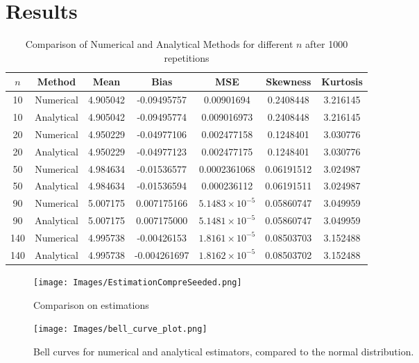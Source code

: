\documentclass{report}
\begin{document}
\section{Results}
\begin{table}[h]
    \centering
    \begin{tabular}{| c | c | c | c | c | c | c |}
        \hline
        $n$ & Method     & Mean     & Bias         & MSE                     & Skewness   & Kurtosis \\
        \hline
        10  & Numerical  & 4.905042 & -0.09495757  & 0.00901694              & 0.2408448  & 3.216145 \\
        10  & Analytical & 4.905042 & -0.09495774  & 0.009016973             & 0.2408448  & 3.216145 \\
        \hline
        20  & Numerical  & 4.950229 & -0.04977106  & 0.002477158             & 0.1248401  & 3.030776 \\
        20  & Analytical & 4.950229 & -0.04977123  & 0.002477175             & 0.1248401  & 3.030776 \\
        \hline
        50  & Numerical  & 4.984634 & -0.01536577  & 0.0002361068            & 0.06191512 & 3.024987 \\
        50  & Analytical & 4.984634 & -0.01536594  & 0.000236112             & 0.06191511 & 3.024987 \\
        \hline
        90  & Numerical  & 5.007175 & 0.007175166  & $5.1483 \times 10^{-5}$ & 0.05860747 & 3.049959 \\
        90  & Analytical & 5.007175 & 0.007175000  & $5.1481 \times 10^{-5}$ & 0.05860747 & 3.049959 \\
        \hline
        140 & Numerical  & 4.995738 & -0.00426153  & $1.8161 \times 10^{-5}$ & 0.08503703 & 3.152488 \\
        140 & Analytical & 4.995738 & -0.004261697 & $1.8162 \times 10^{-5}$ & 0.08503702 & 3.152488 \\
        \hline
    \end{tabular}
    \caption{Comparison of Numerical and Analytical Methods for different $n$ after 1000 repetitions}
\end{table}

\begin{figure}[H]
    \centering
    \texttt{[image: Images/EstimationCompreSeeded.png]}
    \caption{Comparison on estimations}
    \label{fig:enter-label}
\end{figure}

\begin{figure}[H]
    \centering
    \texttt{[image: Images/bell\_curve\_plot.png]}
    \caption{Bell curves for numerical and analytical estimators, compared to the normal distribution.}
    \label{fig:enter-label}
\end{figure}
\end{document}
